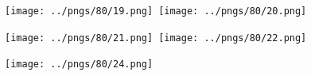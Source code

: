 \begin{figure}[H]
\centering
\mbox{
\texttt{[image: ../pngs/80/19.png]} \quad
\texttt{[image: ../pngs/80/20.png]} 
}
\end{figure}

\begin{figure}[H]
\centering
\mbox{
\texttt{[image: ../pngs/80/21.png]} \quad
\texttt{[image: ../pngs/80/22.png]} 
}
\end{figure}

\begin{figure}[H]
\centering
\mbox{
\texttt{[image: ../pngs/80/24.png]} \quad
}
\end{figure}